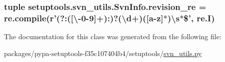 \subsubsection[{revision\+\_\+re}]{\setlength{\rightskip}{0pt plus 5cm}tuple setuptools.\+svn\+\_\+utils.\+Svn\+Info.\+revision\+\_\+re = re.\+compile({\bf r}'(?\+:(\mbox{[}\textbackslash{}-\/0-\/9\mbox{]}+)\+:)?(\textbackslash{}d+)(\mbox{[}{\bf a}-\/z\mbox{]}$\ast$)\textbackslash{}{\bf s}$\ast$\$', re.\+I)\hspace{0.3cm}{\ttfamily [static]}}\label{classsetuptools_1_1svn__utils_1_1SvnInfo_a0237d252d663be30acf705d872948e66}


The documentation for this class was generated from the following file\+:\begin{DoxyCompactItemize}
\item 
packages/pypa-\/setuptools-\/f35c107404b4/setuptools/\hyperlink{svn__utils_8py}{svn\+\_\+utils.\+py}\end{DoxyCompactItemize}
